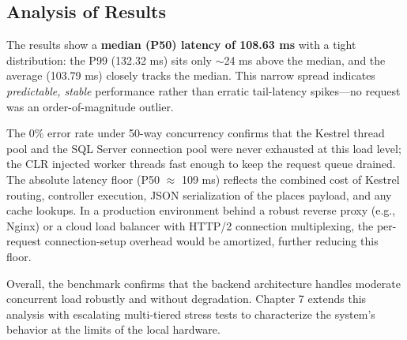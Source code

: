 \subsection{Analysis of Results}
The results show a \textbf{median (P50) latency of 108.63 ms} with a tight distribution: the P99 (132.32 ms) sits only $\sim$24 ms above the median, and the average (103.79 ms) closely tracks the median. This narrow spread indicates \emph{predictable, stable} performance rather than erratic tail-latency spikes—no request was an order-of-magnitude outlier.

The 0\% error rate under 50-way concurrency confirms that the Kestrel thread pool and the SQL Server connection pool were never exhausted at this load level; the CLR injected worker threads fast enough to keep the request queue drained. The absolute latency floor (P50 $\approx$ 109 ms) reflects the combined cost of Kestrel routing, controller execution, JSON serialization of the places payload, and any cache lookups. In a production environment behind a robust reverse proxy (e.g., Nginx) or a cloud load balancer with HTTP/2 connection multiplexing, the per-request connection-setup overhead would be amortized, further reducing this floor.

Overall, the benchmark confirms that the backend architecture handles moderate concurrent load robustly and without degradation. Chapter 7 extends this analysis with escalating multi-tiered stress tests to characterize the system's behavior at the limits of the local hardware.
